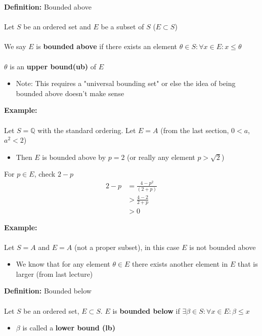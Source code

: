 \documentclass{article}
\newcommand{\Q}{\mathbb{Q}}
\begin{document}
\begin{definition} 
\textbf{Definition:} Bounded above \\
~\\
Let $S$ be an ordered set and $E$ be a subset of $S$ ($E\subset S$) \\
~\\
We say $E$ is {\color{blue} \textbf{bounded above}} if there exists an element $\theta\in S: \forall x\in E: x\le\theta$ \\ 
~\\
$\theta$ is an {\color{blue} \textbf{upper bound(ub)}} of $E$
\begin{itemize}
	\item Note: This requires a "universal bounding set" or else the idea of being bounded above doesn't make sense
\end{itemize}
\end{definition}
\begin{example} 
\textbf{Example:}  \\
~\\
Let $S = \Q$ with the standard ordering. Let $E=A$ (from the last section, $0<a$, $a^2<2$)
\begin{itemize}
	\item Then $E$ is bounded above by $p=2$ (or really any element $p>\sqrt{2}$) 
\end{itemize}
For $p\in E$, check $2-p$
\begin{align}
	2-p &= \frac{4-p^2}{(2+p)} \\
	    &> \frac{4-2}{2+p} \\
	    &>0
\end{align}
\end{example}
\begin{example} 
\textbf{Example:}  \\
~\\
Let $S=A$ and $E=A$ (not a proper subset), in this case $E$ is not bounded above
\begin{itemize}
	\item We know that for any element $\theta\in E$ there exists another element in $E$ that is larger (from last lecture)
\end{itemize}
\end{example}
\begin{definition} 
\textbf{Definition:} Bounded below \\
~\\
Let $S$ be an ordered set, $E\subset S$. $E$ is {\color{blue} \textbf{bounded below}} if $\exists \beta\in S: \forall x\in E: \beta \le  x$
\begin{itemize}
	\item $\beta$ is called a {\color{blue} \textbf{lower bound (lb)}}
\end{itemize}
\end{definition}
\end{document}
